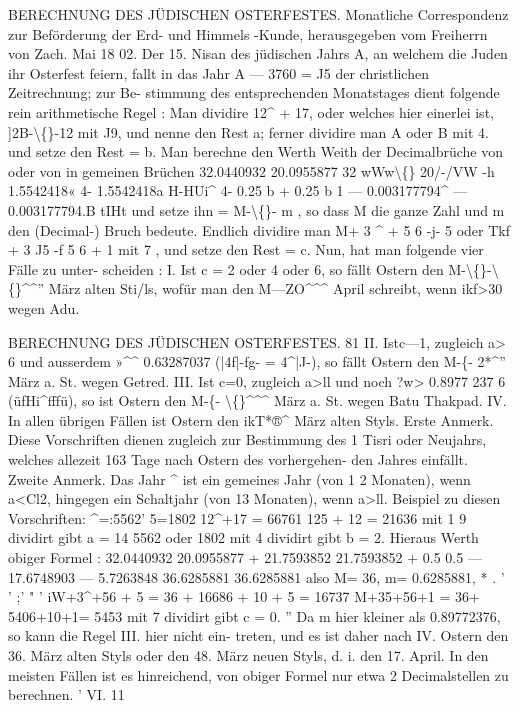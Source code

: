 \documentclass[12pt,a4paper]{article}
\begin{document}
BERECHNUNG  DES  JÜDISCHEN  OSTERFESTES.
Monatliche  Correspondenz  zur  Beförderung  der  Erd-  und  Himmels -Kunde,
herausgegeben  vom  Freiherrn  von  Zach.     Mai  18  02.
Der  15.  Nisan  des  jüdischen  Jahrs  A,  an  welchem  die  Juden  ihr  Osterfest
feiern,  fallt  in  das  Jahr  A ---  3760  =  J5  der  christlichen  Zeitrechnung;  zur  Be-
stimmung des  entsprechenden  Monatstages  dient  folgende  rein  arithmetische
Regel :
Man  dividire  12\^{}  +  17,  oder  welches  hier  einerlei  ist,  ]2B-\textbackslash\{\}-12  mit  J9,
und  nenne  den  Rest  a;  ferner  dividire  man  A  oder  B  mit  4.  und  setze  den
Rest  =  b.     Man  berechne  den  Werth
Weith  der  Decimalbrüche
von
oder  von
in
gemeinen  Brüchen
32.0440932
20.0955877
32 wWw\textbackslash\{\}  20/-/VW
-h    1.5542418«
4-    1.5542418a
H-HUi\^{}
4-   0.25              b
+    0.25              b
1
---    0.003177794\^{}
---   0.003177794.B
tIHt
und  setze  ihn  =  M-\textbackslash\{\}-  m ,  so  dass  M  die  ganze  Zahl  und  m  den  (Decimal-)
Bruch  bedeute.  Endlich  dividire  man  M+  3  \^{}  +  5  6  -j-  5  oder  Tkf  +  3  J5  -f  5  6  + 1
mit  7 ,  und  setze  den  Rest  =  c.  Nun,  hat  man  folgende  vier  Fälle  zu  unter-
scheiden :
I.  Ist  c  =  2  oder  4  oder  6,  so  fällt  Ostern  den  M-\textbackslash\{\}-\textbackslash\{\}\^{}\^{}'' März  alten  Sti/ls,
wofür  man  den  M---ZO\^{}\^{}\^{}  April  schreibt,  wenn  ikf>30  wegen  Adu.

\newpage

BERECHNUNG  DES  JÜDISCHEN  OSTERFESTES.  81
II.  Istc---1,  zugleich  a>  6  und  ausserdem  »\^{}\^{}  0.63287037  (|4f|-fg-  =  4\^{}|J-),
so  fällt  Ostern  den  M-\{-  2*\^{}''  März  a.  St.  wegen  Getred.
III.  Ist  c=0,  zugleich  a>ll  und  noch  ?w>  0.8977  237  6  (üfHi\^{}fffü),
so  ist  Ostern  den  M-\{-  \textbackslash\{\}\^{}\^{}\^{}  März  a.  St.  wegen  Batu  Thakpad.
IV.  In  allen  übrigen  Fällen  ist  Ostern  den  ikT*®\^{}  März  alten  Styls.
Erste  Anmerk.  Diese  Vorschriften  dienen  zugleich  zur  Bestimmung  des
1  Tisri  oder  Neujahrs,  welches  allezeit  163  Tage  nach  Ostern  des  vorhergehen-
den Jahres  einfällt.
Zweite  Anmerk.  Das  Jahr  \^{}  ist  ein  gemeines  Jahr  (von  1 2  Monaten),  wenn
a<Cl2,  hingegen  ein  Schaltjahr  (von  13  Monaten),  wenn  a>ll.
Beispiel  zu  diesen  Vorschriften:  \^{}=:5562'  5=1802
12\^{}+17  =  66761  125  +  12  =  21636
mit  1 9  dividirt  gibt   a  =  14
5562  oder   1802  mit  4   dividirt  gibt    b  =  2.
Hieraus  Werth  obiger  Formel :         32.0440932  20.0955877
+  21.7593852  21.7593852
+    0.5  0.5
---  17.6748903  ---   5.7263848
36.6285881  36.6285881
also    M=  36,       m=  0.6285881,  *  .  ' '     ;' "
'
iW+3\^{}+56  +  5  =  36  +  16686  +  10  +  5  =  16737
M+35+56+1  =  36+    5406+10+1=     5453
mit  7  dividirt  gibt   c  =  0.  ''
Da  m  hier  kleiner  als  0.89772376,  so  kann  die  Regel  III.  hier  nicht  ein-
treten, und  es  ist  daher  nach  IV.  Ostern  den  36.  März  alten  Styls  oder  den
48.  März  neuen  Styls,  d.  i.  den  17.  April.
In  den  meisten  Fällen  ist  es  hinreichend,  von  obiger  Formel  nur  etwa  2
Decimalstellen  zu  berechnen.  '
VI.  11
\end{document}
